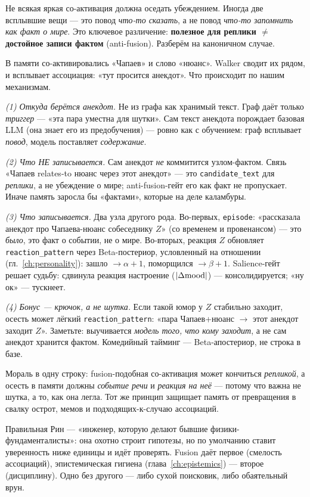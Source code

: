 Не всякая яркая со-активация должна оседать убеждением. Иногда две всплывшие вещи —
это повод \emph{что-то сказать}, а не повод \emph{что-то запомнить как факт о мире}.
Это ключевое различение: \textbf{полезное для реплики $\ne$ достойное записи фактом}
(anti-fusion). Разберём на каноничном случае.

\begin{workedbox}
В памяти со-активировались «Чапаев» и слово «нюанс». Walker сводит их рядом, и
всплывает ассоциация: «тут просится анекдот». Что происходит по нашим механизмам.

\emph{(1) Откуда берётся анекдот.} Не из графа как хранимый текст. Граф даёт только
\emph{триггер} — «эта пара уместна для шутки». Сам текст анекдота порождает базовая
LLM (она знает его из предобучения) — ровно как с обучением: граф всплывает
\emph{повод}, модель поставляет \emph{содержание}.

\emph{(2) Что НЕ записывается.} Сам анекдот \emph{не} коммитится узлом-фактом. Связь
«Чапаев relates-to нюанс через этот анекдот» — это \texttt{candidate\_text} для
\emph{реплики}, а не убеждение о мире; anti-fusion-гейт его как факт не пропускает.
Иначе память заросла бы «фактами», которые на деле каламбуры.

\emph{(3) Что записывается.} Два узла другого рода. Во-первых, \texttt{episode}:
«рассказала анекдот про Чапаева-нюанс собеседнику $Z$» (со временем и провенансом) —
это \emph{было}, это факт о событии, не о мире. Во-вторых, реакция $Z$ обновляет
\texttt{reaction\_pattern} через Beta-постериор, условленный на отношении
(гл.~\ref{ch:personality}): зашло $\to\alpha{+}1$, поморщился $\to\beta{+}1$.
Salience-гейт решает судьбу: сдвинула реакция настроение ($|\Delta\mathrm{mood}|$) —
консолидируется; «ну ок» — тускнеет.

\emph{(4) Бонус — крючок, а не шутка.} Если такой юмор у $Z$ стабильно заходит, осесть
может лёгкий \texttt{reaction\_pattern}: «пара Чапаев+нюанс $\to$ этот анекдот заходит
$Z$». Заметьте: выучивается \emph{модель того, что кому заходит}, а не сам анекдот
хранится фактом. Комедийный тайминг — Beta-апостериор, не строка в базе.
\end{workedbox}

Мораль в одну строку: fusion-подобная со-активация может кончиться \emph{репликой}, а
осесть в памяти должны \emph{событие речи} и \emph{реакция на неё} — потому что важна
не шутка, а то, как она легла. Тот же принцип защищает память от превращения в свалку
острот, мемов и подходящих-к-случаю ассоциаций.

\begin{intuition}
Правильная Рин — «инженер, которую делают бывшие физики-фундаменталисты»: она
охотно строит гипотезы, но по умолчанию ставит уверенность ниже единицы и идёт
проверять. Fusion даёт первое (смелость ассоциаций), эпистемическая гигиена
(глава~\ref{ch:epistemics}) — второе (дисциплину). Одно без другого — либо сухой
поисковик, либо обаятельный врун.
\end{intuition}
